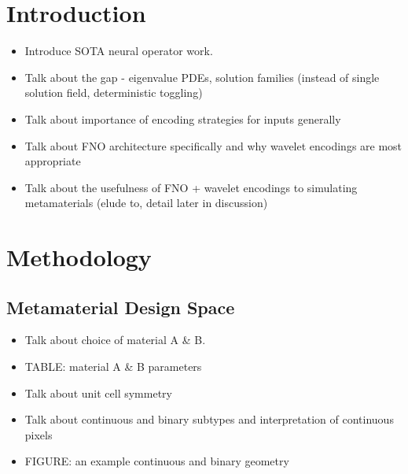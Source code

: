 \documentclass[preprint,review,12pt]{elsarticle}
\begin{document}


\newpage
\section{Introduction}
\label{introduction}
\begin{itemize}[noitemsep]
    \item Introduce SOTA neural operator work.
    \item Talk about the gap - eigenvalue PDEs, solution families (instead of single solution field, deterministic toggling)
    \item Talk about importance of encoding strategies for inputs generally
    \item Talk about FNO architecture specifically and why wavelet encodings are most appropriate
    \item Talk about the usefulness of FNO + wavelet encodings to simulating metamaterials (elude to, detail later in discussion)
\end{itemize}

\newpage
\section{Methodology}
\label{sec:Methodology}

\subsection{Metamaterial Design Space}
\label{ssec:metamaterial_design_space}
\begin{itemize}[noitemsep]
    \item Talk about choice of material A \& B.
    \item TABLE: material A \& B parameters
    \item Talk about unit cell symmetry
    \item Talk about continuous and binary subtypes and interpretation of continuous pixels
    \item FIGURE: an example continuous and binary geometry
\end{itemize}

\newpage
\end{document}
